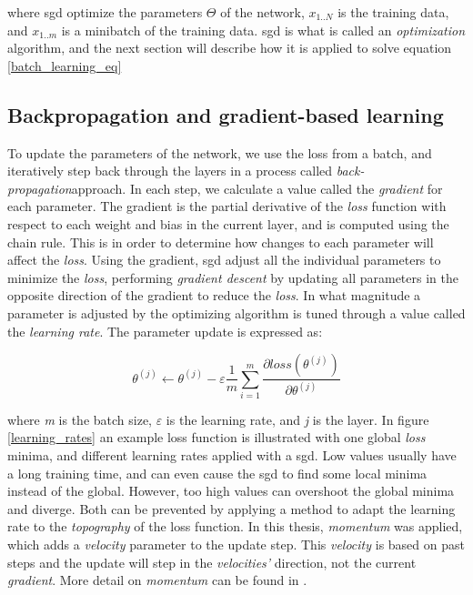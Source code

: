     where \gls{sgd} optimize the parameters $\Theta$ of the network, $x_{1..N}$ is the training data, and $x_{1..m}$ is a minibatch of the training data. \gls{sgd} is what is called an \textit{optimization} algorithm, and the next section will describe how it is applied to solve equation \ref{batch_learning_eq}
    
    
\subsection{Backpropagation and gradient-based learning}
    To update the parameters of the network, we use the loss from a batch, and iteratively step back through the layers in a process called \textit{back-propagation}approach\cite{rumelhart1986learning_backprop}. In each step, we calculate a value called the \textit{gradient} for each parameter. The gradient is the partial derivative of the \textit{loss} function with respect to each weight and bias in the current layer, and is computed using the chain rule. This is in order to determine how changes to each parameter will affect the \textit{loss}. Using the gradient, \gls{sgd} adjust all the individual parameters to minimize the \textit{loss}, performing \textit{gradient descent}\cite{Goodfellow-et-al-2016_gradient_descent} by updating all parameters in the opposite direction of the gradient to reduce the \textit{loss}. In what magnitude a parameter is adjusted by the optimizing algorithm is tuned through a value called the \textit{learning rate}. The parameter update is expressed as:
    
    \begin{equation}
    \theta^{(j)} \leftarrow \theta^{(j)} - \varepsilon \dfrac{1}{m}\sum_{i=1}^{m} \dfrac{\partial loss (\theta^{(j)})}{\partial \theta^{(j)}}
    \end{equation}
    
    where \textit{m} is the batch size, $\varepsilon$ is the learning rate, and \textit{j} is the layer. In figure \ref{learning_rates} an example loss function is illustrated with one global \textit{loss} minima, and different learning rates applied with a \gls{sgd}. Low values usually have a long training time, and can even cause the \gls{sgd} to find some local minima\cite{farsal2018deep} instead of the global. However, too high values can overshoot the global minima and diverge. Both can be prevented by applying a method to adapt the learning rate to the \textit{topography} of the loss function. In this thesis, \textit{momentum} was applied, which adds a \textit{velocity} parameter to the update step. This \textit{velocity} is based on past steps and the update will step in the \textit{velocities'} direction, not the current \textit{gradient}. More detail on \textit{momentum} can be found in \citeauthor{pmlr-v28-sutskever13}\cite{pmlr-v28-sutskever13}.
    
